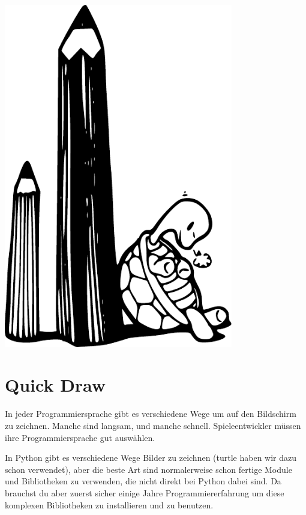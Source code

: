 \begin{center}
\includegraphics*[width=100mm]{images/turtle1}
\end{center}

\section{Quick Draw}

In jeder Programmiersprache gibt es verschiedene Wege um auf den Bildschirm zu zeichnen. Manche sind langsam, und manche schnell. Spieleentwickler müssen ihre Programmiersprache gut auswählen.
\par
In Python gibt es verschiedene Wege Bilder zu zeichnen (turtle haben wir dazu schon verwendet), aber die beste Art sind normalerweise schon fertige Module und Bibliotheken zu verwenden, die nicht direkt bei Python dabei sind. Da brauchst du aber zuerst sicher einige Jahre Programmiererfahrung um diese komplexen Bibliotheken zu installieren und zu benutzen.

